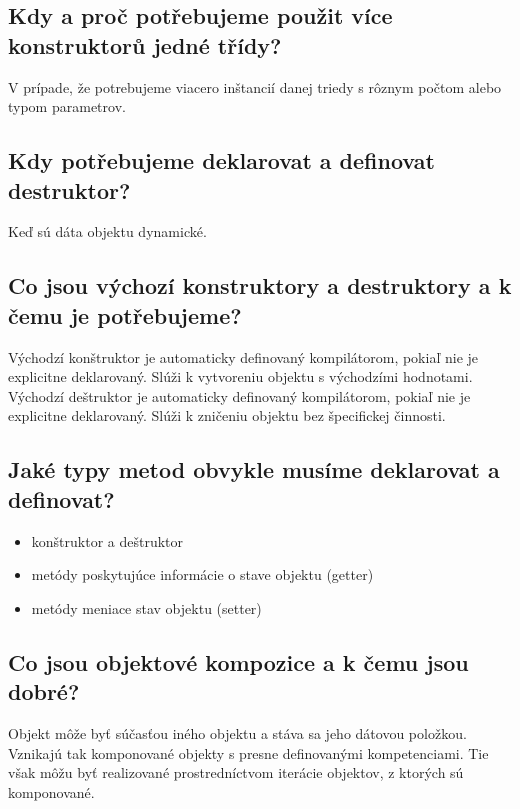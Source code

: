 \subsection{Kdy a proč potřebujeme použit více konstruktorů jedné třídy?}
V prípade, že potrebujeme viacero inštancií danej triedy s rôznym počtom alebo typom parametrov.


\subsection{Kdy potřebujeme deklarovat a definovat destruktor?}
Keď sú dáta objektu dynamické.


\subsection{Co jsou výchozí konstruktory a destruktory a k čemu je potřebujeme?}
Východzí konštruktor je automaticky definovaný kompilátorom, pokiaľ nie je explicitne deklarovaný. Slúži k vytvoreniu objektu s východzími hodnotami. \newline
Východzí deštruktor je automaticky definovaný kompilátorom, pokiaľ nie je explicitne deklarovaný. Slúži k zničeniu objektu bez špecifickej činnosti.


\subsection{Jaké typy metod obvykle musíme deklarovat a definovat?}
\begin{itemize}
    \item konštruktor a deštruktor
    \item metódy poskytujúce informácie o stave objektu (getter)
    \item metódy meniace stav objektu (setter)
\end{itemize}


\subsection{Co jsou objektové kompozice a k čemu jsou dobré?}
Objekt môže byť súčasťou iného objektu a stáva sa jeho dátovou položkou. \newline
Vznikajú tak komponované objekty s presne definovanými kompetenciami. Tie však môžu byť realizované prostredníctvom iterácie objektov, z ktorých sú komponované.